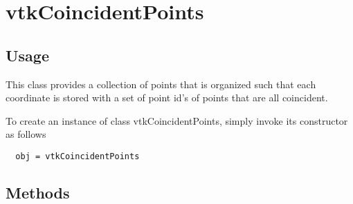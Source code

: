 \section{vtkCoincidentPoints}

\subsection{Usage}

 This class provides a collection of points that is organized such that 
 each coordinate is stored with a set of point id's of points that are 
 all coincident.

To create an instance of class vtkCoincidentPoints, simply
invoke its constructor as follows
\begin{verbatim}
  obj = vtkCoincidentPoints
\end{verbatim}
\subsection{Methods}

